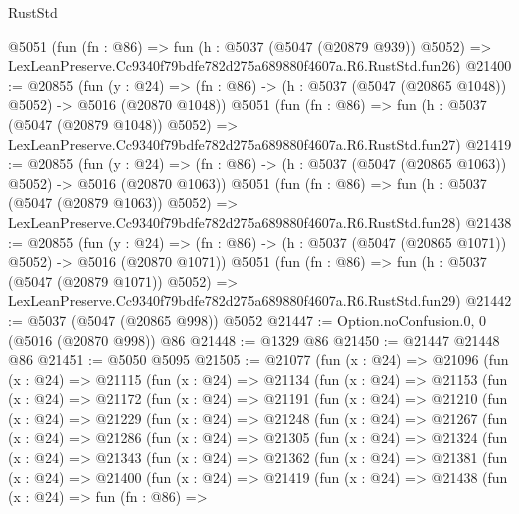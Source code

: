 \begin{lexlean}{RustStd}
\begin{coremodule}
    @5051
    (fun (fn : @86) =>
    fun (h : @5037 (@5047 (@20879 @939)) @5052) =>
    LexLeanPreserve.Cc9340f79bdfe782d275a689880f4607a.R6.RustStd.fun26)
@21400 := @20855
    (fun (y : @24) =>
    (fn : @86) -> (h : @5037 (@5047 (@20865 @1048)) @5052) -> @5016 (@20870 @1048))
    @5051
    (fun (fn : @86) =>
    fun (h : @5037 (@5047 (@20879 @1048)) @5052) =>
    LexLeanPreserve.Cc9340f79bdfe782d275a689880f4607a.R6.RustStd.fun27)
@21419 := @20855
    (fun (y : @24) =>
    (fn : @86) -> (h : @5037 (@5047 (@20865 @1063)) @5052) -> @5016 (@20870 @1063))
    @5051
    (fun (fn : @86) =>
    fun (h : @5037 (@5047 (@20879 @1063)) @5052) =>
    LexLeanPreserve.Cc9340f79bdfe782d275a689880f4607a.R6.RustStd.fun28)
@21438 := @20855
    (fun (y : @24) =>
    (fn : @86) -> (h : @5037 (@5047 (@20865 @1071)) @5052) -> @5016 (@20870 @1071))
    @5051
    (fun (fn : @86) =>
    fun (h : @5037 (@5047 (@20879 @1071)) @5052) =>
    LexLeanPreserve.Cc9340f79bdfe782d275a689880f4607a.R6.RustStd.fun29)
@21442 := @5037 (@5047 (@20865 @998)) @5052
@21447 := Option.noConfusion.{0, 0} (@5016 (@20870 @998)) @86
@21448 := @1329 @86
@21450 := @21447 @21448 @86
@21451 := @5050 @5095
@21505 := @21077
    (fun (x : @24) =>
    @21096
      (fun (x : @24) =>
      @21115
        (fun (x : @24) =>
        @21134
          (fun (x : @24) =>
          @21153
            (fun (x : @24) =>
            @21172
              (fun (x : @24) =>
              @21191
                (fun (x : @24) =>
                @21210
                  (fun (x : @24) =>
                  @21229
                    (fun (x : @24) =>
                    @21248
                      (fun (x : @24) =>
                      @21267
                        (fun (x : @24) =>
                        @21286
                          (fun (x : @24) =>
                          @21305
                            (fun (x : @24) =>
                            @21324
                              (fun (x : @24) =>
                              @21343
                                (fun (x : @24) =>
                                @21362
                                  (fun (x : @24) =>
                                  @21381
                                    (fun (x : @24) =>
                                    @21400
                                      (fun (x : @24) =>
                                      @21419
                                        (fun (x : @24) =>
                                        @21438
                                          (fun (x : @24) =>
                                          fun (fn : @86) =>

\end{coremodule}
\end{lexlean}
